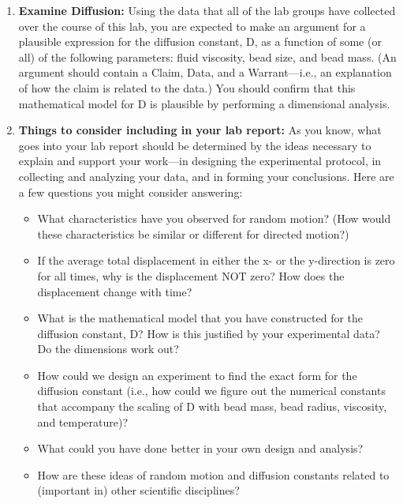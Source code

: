 \begin{enumerate}
\item \textbf{Examine Diffusion:} Using the data that all of the lab groups have collected over the course of this lab, you are expected to make an argument for a plausible expression for the diffusion constant, D, as a function of some (or all) of the following parameters: fluid viscosity, bead size, and bead mass. (An argument should contain a Claim, Data, and a Warrant—i.e., an explanation of how the claim is related to the data.) You should confirm that this mathematical model for D is plausible by performing a dimensional analysis.
\item \textbf{Things to consider including in your lab report:} As you know, what goes into your lab report should be determined by the ideas necessary to explain and support your work—in designing the experimental protocol, in collecting and analyzing your data, and in forming your conclusions. Here are a few questions you might consider answering:
\begin{itemize}
\item What characteristics have you observed for random motion? (How would these characteristics be similar or different for directed motion?)
\item If the average total displacement in either the x- or the y-direction is zero for all times, why is the displacement NOT zero? How does the displacement change with time?
\item What is the mathematical model that you have constructed for the diffusion constant, D? How is this justified by your experimental data? Do the dimensions work out?
\item How could we design an experiment to find the exact form for the diffusion constant (i.e., how could we figure out the numerical constants that accompany the scaling of D with bead mass, bead radius, viscosity, and temperature)?
\item What could you have done better in your own design and analysis?
\item How are these ideas of random motion and diffusion constants related to (important in) other scientific disciplines?
\end{itemize}
\end{enumerate}

